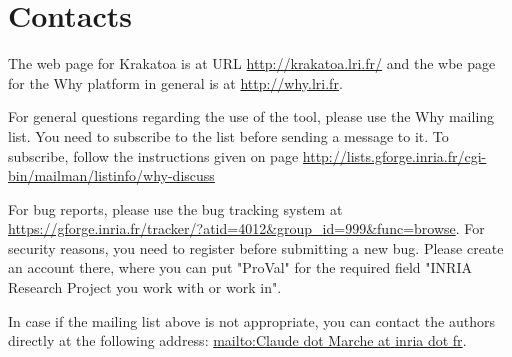 \documentclass[a4paper,11pt,twoside,openright]{report}
\begin{document}
\section{Contacts}

The web page for Krakatoa is at URL \url{http://krakatoa.lri.fr/} and
the wbe page for the Why platform in general is at
\url{http://why.lri.fr}.

For general questions regarding the use of the tool, please use the
Why mailing list. You need to subscribe to the list before sending a
message to it. To subscribe, follow the instructions given on page
\url{http://lists.gforge.inria.fr/cgi-bin/mailman/listinfo/why-discuss}

For bug reports, please use the bug tracking system at
\url{https://gforge.inria.fr/tracker/?atid=4012&group_id=999&func=browse}. For
security reasons, you need to register before submitting a new
bug. Please create an account there, where you can put "ProVal" for
the required field "INRIA Research Project you work with or work in".

In case if the mailing list above is not appropriate, you can contact
the authors directly at the following address: \url{mailto:Claude dot
  Marche at inria dot fr}.

\cleardoublepage



%
\cleardoublepage

\printindex
\cleardoublepage
\end{document}
